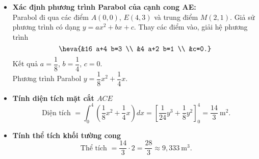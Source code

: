 \begin{ex}
{\begin{center}
\begin{tikzpicture}[line join=round,line cap=round,>=stealth,font=\footnotesize,scale=.8, declare function={f(\x)=0.2*((\x)^2);}]
		\end{tikzpicture}
	\end{center}
	\begin{itemize}
		\item \textbf{Xác định phương trình Parabol của cạnh cong AE:} \\
		Parabol đi qua các điểm $A(0,0)$, $E(4,3)$ và trung điểm $M(2,1)$.
		Giả sử phương trình có dạng $y=a x^2+b x+c$.
		Thay các điểm vào, giải hệ phương trình
		$$
		\heva{&16 a+4 b=3 \\
		&4 a+2 b=1 \\
		&c=0.}$$
		Kết quả $a=\dfrac{1}{8}$, $b=\dfrac{1}{4}$, $c=0$.\\
		Phương trình Parabol $y=\dfrac{1}{8} x^2+\dfrac{1}{4} x$.
		\item \textbf{Tính diện tích mặt cắt $ACE$}$$
		\text { Diện tích }=\int_0^4\left(\dfrac{1}{8} x^2+\dfrac{1}{4} x\right) d x=\left[\dfrac{1}{24} y^3+\dfrac{1}{8} y^2\right]_0^4=\dfrac{14}{3} \mathrm{~m}^2.
		$$
		\item \textbf{Tính thể tích khối tường cong}\\
		$$\text { Thể tích }=\dfrac{14}{3}\cdot 2=\dfrac{28}{3} \approx 9{,}333 \mathrm{~m}^3.$$
	\end{itemize}
	}
\end{ex}


